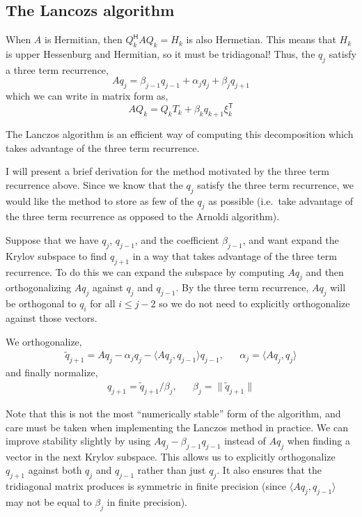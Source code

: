 \documentclass[10pt]{article}
\begin{document}
\subsection{The Lancozs algorithm}

When \(A\) is Hermitian, then \(Q_k^{\mathsf{H}}AQ_k = H_k\) is also Hermetian.
This means that \(H_k\) is upper Hessenburg and Hermitian, so it must be tridiagonal!
Thus, the \(q_j\) satisfy a three term recurrence,
\[
Aq_j = \beta_{j-1} q_{j-1} + \alpha_j q_j + \beta_j q_{j+1}
\]
which we can write in matrix form as,
\[
AQ_k = Q_k T_k + \beta_k q_{k+1} \xi_k^{\mathsf{T}}
\]

The Lanczos algorithm is an efficient way of computing this decomposition which takes advantage of the three term recurrence.

I will present a brief derivation for the method motivated by the three term recurrence above.
Since we know that the \(q_j\) satisfy the three term recurrence, we would like the method to store as few of the \(q_j\) as possible (i.e.~take advantage of the three term recurrence as opposed to the Arnoldi algorithm).

Suppose that we have \(q_j\), \(q_{j-1}\), and the coefficient \(\beta_{j-1}\), and want expand the Krylov subspace to find \(q_{j+1}\) in a way that takes advantage of the three term recurrence.
To do this we can expand the subspace by computing \(Aq_j\) and then orthogonalizing \(Aq_j\) against \(q_j\) and \(q_{j-1}\).
By the three term recurrence, \(Aq_j\) will be orthogonal to \(q_i\) for all \(i\leq j-2\) so we do not need to explicitly orthogonalize against those vectors.

We orthogonalize,
\begin{align*}
\tilde{q}_{j+1} = Aq_j - \alpha_j q_j - \langle Aq_j, q_{j-1} \rangle q_{j-1}
, && 
\alpha_{j} = \langle A q_j, q_j \rangle
\end{align*}
and finally normalize,
\begin{align*}
q_{j+1} = \tilde{q}_{j+1} / \beta_j
,&&
\beta_j = \|\tilde{q}_{j+1}\|
\end{align*}

Note that this is not the most ``numerically stable'' form of the algorithm, and care must be taken when implementing the Lanczos method in practice.
We can improve stability slightly by using \(Aq_j - \beta_{j-1} q_{j-1}\) instead of \(Aq_j\) when finding a vector in the next Krylov subspace.
This allows us to explicitly orthogonalize \(q_{j+1}\) against both \(q_j\) and \(q_{j-1}\) rather than just \(q_j\).
It also ensures that the tridiagonal matrix produces is symmetric in finite precision (since \(\langle Aq_j,q_{j-1}\rangle\) may not be equal to \(\beta_j\) in finite precision).
\end{document}
